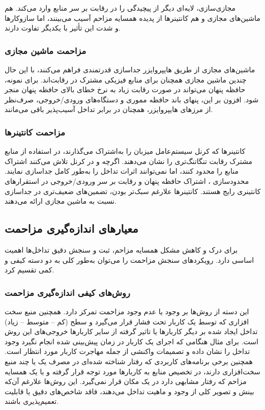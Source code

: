 مجازی‌سازی، لایه‌ای دیگر از پیچیدگی را در رقابت بر سر منابع وارد می‌کند. هم ماشین‌های مجازی و هم کانتینرها از پدیده همسایه مزاحم آسیب می‌بینند، اما سازوکارها و شدت این تأثیر با یکدیگر تفاوت دارند.

\subsubsection{مزاحمت ماشین مجازی}

ماشین‌های مجازی از طریق هایپروایزر جداسازی قدرتمندی فراهم می‌کنند، با این حال چندین ماشین مجازی همچنان برای منابع فیزیکی مشترک در رقابت‌اند. برای نمونه، حافظه پنهان  می‌تواند در صورت رقابت زیاد به نرخ خطای بالای حافظه پنهان منجر شود. افزون بر این، پنهای باند حافظه مموری و دستگاه‌های ورودی/خروجی، صرف‌نظر از مرزهای هایپروایزر، همچنان در برابر تداخل آسیب‌پذیر باقی می‌مانند.

\subsubsection{مزاحمت کانتینر‌ها}

کانتینرها که کرنل سیستم‌عامل میزبان را به‌اشتراک می‌گذارند، در استفاده از منابع مشترک رقابت تنگاتنگ‌تری را نشان می‌دهند. اگرچه  و  در کرنل تلاش می‌کنند اشتراک منابع را محدود کنند، اما نمی‌توانند اثرات تداخل را به‌طور کامل جداسازی نمایند. محدودسازی ، اشتراک حافظه پنهان و رقابت بر سر ورودی/خروجی در استقرارهای کانتینری  رایج هستند. کانتینرها علارغم سبک‌تر بودن، تضمین‌های ضعیف‌تری در جداسازی نسبت به ماشین مجازی ارائه می‌دهند.

\subsection{معیارهای اندازه‌گیری مزاحمت}

برای درک و کاهش مشکل همسایه مزاحم، ثبت و سنجش دقیق تداخل‌ها اهمیت اساسی دارد. رویکردهای سنجش مزاحمت را می‌توان به‌طور کلی به دو دسته کیفی و کمی تقسیم کرد.

\subsubsection{روش‌های کیفی اندازه‌گیری مزاحمت}

این دسته از روش‌ها بر وجود یا عدم وجود مزاحمت تمرکز دارد. همچنین منبع سخت افزاری که توسط یک کاربار تحت فشار قرار می‌گیرد و سطح (کم – متوسط – زیاد) تداخل ایجاد شده بر دیگر کاربارها یا تاثیر گرفته از سایر کاربارها خروجی‌های این روش است. برای مثال هنگامی که اجرای یک کاربار در زمان پیش‌بینی شده انجام نگیرد وجود تداخل را نشان داده و تصمیمات واکنشی از جمله مهاجرت کاربار مورد انتظار است. همچنین برخی برنامه‌های کاربردی که رفتار شناخته شده‌ای در مصرف یک یا چند منبع سخت‌افزاری دارند، در تخصیص منابع به کاربارها مورد توجه قرار گرفته و با یک همسایه مزاحم که رفتار مشابهی دارد در یک مکان قرار نمی‌گیرد. این روش‌ها علارغم آن‌که بینش و تصویر کلی از وجود و ماهیت تداخل می‌دهند،‌ فاقد شاخص‌های دقیق یا قابلیت تعمیم‌پذیری باشند.

